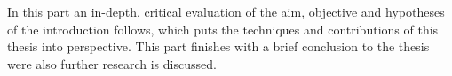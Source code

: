 \chapter*{}
\label{ch:discussion}

In this part an in-depth, critical evaluation of the aim, objective and hypotheses of the introduction follows, which puts the techniques and contributions of this thesis into perspective. This part finishes with a brief conclusion to the thesis were also further research is discussed.



